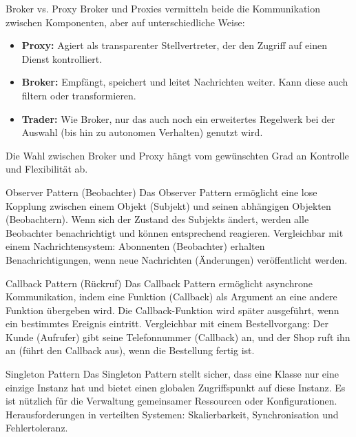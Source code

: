 \documentclass{beamer}
\begin{document}
\begin{frame}{Broker vs. Proxy}
    Broker und Proxies vermitteln beide die Kommunikation zwischen Komponenten, aber auf unterschiedliche Weise:
    \begin{itemize}
        \item \textbf{Proxy:} Agiert als transparenter Stellvertreter, der den Zugriff auf einen Dienst kontrolliert.
        \item \textbf{Broker:} Empfängt, speichert und leitet Nachrichten weiter. Kann diese auch filtern oder transformieren.
        \item \textbf{Trader:} Wie Broker, nur das auch noch ein erweitertes Regelwerk bei der Auswahl (bis hin zu autonomen Verhalten) genutzt wird.
    \end{itemize}
    Die Wahl zwischen Broker und Proxy hängt vom gewünschten Grad an Kontrolle und Flexibilität ab.
\end{frame}

\begin{frame}{Observer Pattern (Beobachter)}
    Das Observer Pattern ermöglicht eine lose Kopplung zwischen einem Objekt (Subjekt) und seinen abhängigen Objekten (Beobachtern). Wenn sich der Zustand des Subjekts ändert, werden alle Beobachter benachrichtigt und können entsprechend reagieren. Vergleichbar mit einem Nachrichtensystem: Abonnenten (Beobachter) erhalten Benachrichtigungen, wenn neue Nachrichten (Änderungen) veröffentlicht werden.
\end{frame}

\begin{frame}{Callback Pattern (Rückruf)}
    Das Callback Pattern ermöglicht asynchrone Kommunikation, indem eine Funktion (Callback) als Argument an eine andere Funktion übergeben wird. Die Callback-Funktion wird später ausgeführt, wenn ein bestimmtes Ereignis eintritt. Vergleichbar mit einem Bestellvorgang: Der Kunde (Aufrufer) gibt seine Telefonnummer (Callback) an, und der Shop ruft ihn an (führt den Callback aus), wenn die Bestellung fertig ist.
\end{frame}

\begin{frame}{Singleton Pattern}
    Das Singleton Pattern stellt sicher, dass eine Klasse nur eine einzige Instanz hat und bietet einen globalen Zugriffspunkt auf diese Instanz. Es ist nützlich für die Verwaltung gemeinsamer Ressourcen oder Konfigurationen. \newline Herausforderungen in verteilten Systemen: Skalierbarkeit, Synchronisation und Fehlertoleranz.
\end{frame}
\end{document}
